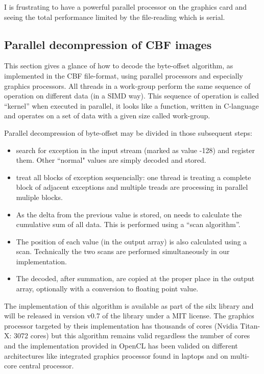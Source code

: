 \documentclass[preprint, pdf]{iucr}              %
\begin{document}
I is frustrating to have a powerful parallel processor on the
graphics card and seeing the total performance limited by the file-reading
which is serial.

\subsection{Parallel decompression of CBF images}
 
This section gives a glance of how to decode the byte-offset algorithm, as
implemented in the CBF file-format, using parallel processors and especially
graphics processors.
All threads in a work-group perform the same sequence of operation
on different data (in a SIMD way).
This sequence of operation is called ``kernel'' when executed in parallel, it
looks like a function, written in C-language and operates on a set of data with
a given size called work-group.

Parallel decompression of byte-offset may be divided in those subsequent steps:
\begin{itemize}
  \item search for exception in the input stream (marked as value -128) and
  register them. Other ``normal" values are simply decoded and stored.
  \item treat all blocks of exception sequencially: one thread is treating a
  complete block of adjacent exceptions and multiple treads are processing in
  parallel muliple blocks.
  \item As the delta from the previous value is stored, on needs to calculate
  the cumulative sum of all data. This is performed using a ``scan
  algorithm''\cite{scan}.
  \item The position of each value (in the output array) is also calculated
  using a scan. Technically the two scans are performed simultaneously in our
  implementation.
  \item The decoded, after summation, are copied at the proper place in the
  output array, optionally with a conversion to floating point value.
\end{itemize} 

The implementation of this algorithm is available as part of the silx
\cite{silx} library and will be released in version v0.7 of the library under a
MIT license.
The graphics processor targeted by theis implementation has thousands of cores
(Nvidia Titan-X: 3072 cores) but this algorithm remains valid regardless the
number of cores and the implementation provided in OpenCL \cite{pyopencl} has
been valided on different architectures like integrated graphics processor found
in laptops and on multi-core central processor.
\end{document}
